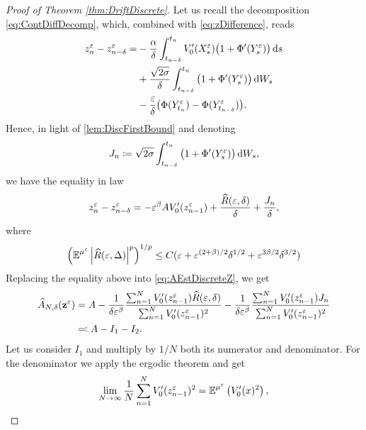 \documentclass[10pt]{article}
\begin{document}
\begin{proof}[Proof of Theorem \ref{thm:DriftDiscrete}]  Let us recall the decomposition \eqref{eq:ContDiffDecomp}, which, combined with \eqref{eq:zDifference}, reads
	\begin{equation}
	\begin{aligned}
		z^\varepsilon_n - z^\varepsilon_{n-\delta} = &- \frac{\alpha}{\delta}\int_{t_{n-\delta}}^{t_n} V_0'(X^\varepsilon_s)\big(1 + \Phi'(Y^\varepsilon_s)\big)\,\mathrm{d} s \\
		&+\frac{\sqrt{2\sigma}}{\delta}\int_{t_{n-\delta}}^{t_n} \big(1 + \Phi'(Y^\varepsilon_s)\big) \,\mathrm{d} W_s \\
		&-\frac{\varepsilon}{\delta} \big(\Phi(Y^\varepsilon_{t_n})- \Phi(Y^\varepsilon_{t_{n-\delta}})\big).
	\end{aligned}
	\end{equation}
	Hence, in light of \ref{lem:DiscFirstBound} and denoting 
	\begin{equation}
		J_n \coloneqq \sqrt{2\sigma}\int_{t_{n-\delta}}^{t_n} \big(1 + \Phi'(Y^\varepsilon_s)\big) \,\mathrm{d} W_s,
	\end{equation}
	we have the equality in law
	\begin{equation}
		z^\varepsilon_n - z^\varepsilon_{n-\delta} = -\varepsilon^\beta A V_0'(z^\varepsilon_{n-1}) + \frac{\widehat R(\varepsilon, \delta)}{\delta} + \frac{J_n}{\delta},
	\end{equation}
	where
	\begin{equation}
		\left(\operatorname{\mathbb{E}}^{\mu^\varepsilon} \left\lvert\widehat R(\varepsilon, \Delta)\right\rvert^p\right)^{1/p} \leq C(\varepsilon +  \varepsilon^{(2+\beta)/2}\delta^{1/2} + \varepsilon^{3\beta/2}\delta^{3/2})
	\end{equation}
	Replacing the equality above into \eqref{eq:AEstDiscreteZ}, we get
	\begin{equation}
	\begin{aligned}
		\widehat A_{N, \delta}(\mathbf z^\varepsilon) &= A -\frac{1}{\delta \varepsilon^\beta}\frac{\sum_{n=1}^{N}V_0'(z^\varepsilon_{n-1})\widehat R(\varepsilon, \delta)}{\sum_{n=1}^{N} V_0'(z^\varepsilon_{n-1})^2} - \frac{1}{\delta \varepsilon^\beta}\frac{\sum_{n=1}^{N}V_0'(z^\varepsilon_{n-1})J_n}{\sum_{n=1}^{N} V_0'(z^\varepsilon_{n-1})^2} \\
		&\eqqcolon A - I_1 - I_2.
	\end{aligned}
	\end{equation}
	Let us consider $I_1$ and multiply by $1/N$ both its numerator and denominator. For the denominator we apply the ergodic theorem and get
	\begin{equation}
		\lim_{N \to \infty} \frac1N \sum_{n=1}^{N} V_0'(z^\varepsilon_{n-1})^2 = \operatorname{\mathbb{E}}^{\mu^\varepsilon} \left(V_0'(x)^2\right),
	\end{equation}

\end{proof}
\end{document}
